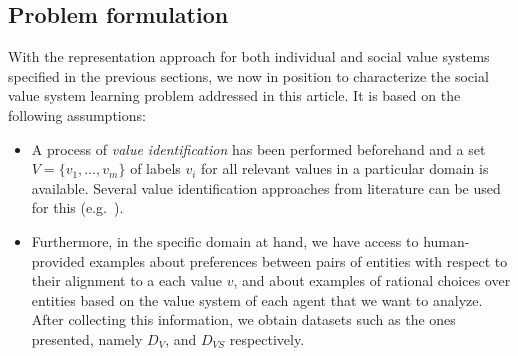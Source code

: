 \documentclass{ecai}
\begin{document}

\subsection{Problem formulation}
With the representation approach for both individual and social value systems specified in the previous sections, we now in position to characterize the social value system learning problem addressed in this article. It is based on the following assumptions:
\begin{itemize}
    \item A process of \emph{value identification} has been performed \cite{Liscio2023BlueskyTrackValueInference} beforehand and a set $V = \{v_1, \dots, v_m\}$ of labels $v_i$ for all relevant values in a particular domain is available. Several value identification approaches from literature can be used for this (e.g.~\cite{wilson2018valueidentificationtext,Liscio2023,QiuZhaoLiLuPengGaoZhu2022ValueNetDataset}).
    \item Furthermore, in the specific domain at hand, we have access to human-provided examples about preferences between pairs of entities with respect to their alignment to a each value $v$, and about examples of rational choices over entities based on the value system of each agent that we want to analyze. After collecting this information, we obtain datasets such as the ones presented, namely $D_V$, and $D_{VS}$ respectively.
    
\end{itemize}
\end{document}

